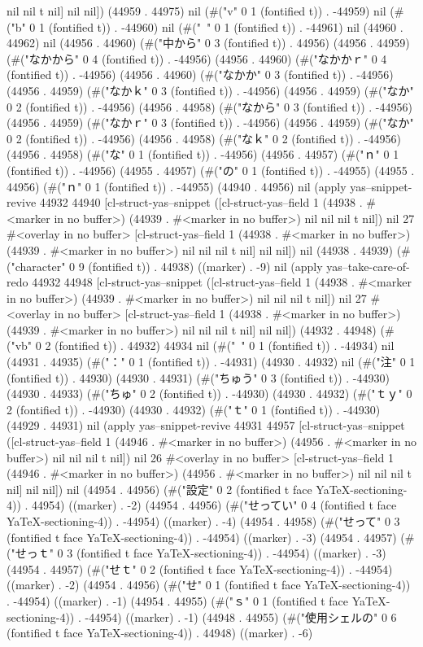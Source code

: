 nil nil t nil] nil nil]) (44959 . 44975) nil (#("v" 0 1 (fontified t)) . -44959) nil (#("b" 0 1 (fontified t)) . -44960) nil (#("~" 0 1 (fontified t)) . -44961) nil (44960 . 44962) nil (44956 . 44960) (#("中から" 0 3 (fontified t)) . 44956) (44956 . 44959) (#("なかから" 0 4 (fontified t)) . -44956) (44956 . 44960) (#("なかかｒ" 0 4 (fontified t)) . -44956) (44956 . 44960) (#("なかか" 0 3 (fontified t)) . -44956) (44956 . 44959) (#("なかｋ" 0 3 (fontified t)) . -44956) (44956 . 44959) (#("なか" 0 2 (fontified t)) . -44956) (44956 . 44958) (#("なから" 0 3 (fontified t)) . -44956) (44956 . 44959) (#("なかｒ" 0 3 (fontified t)) . -44956) (44956 . 44959) (#("なか" 0 2 (fontified t)) . -44956) (44956 . 44958) (#("なｋ" 0 2 (fontified t)) . -44956) (44956 . 44958) (#("な" 0 1 (fontified t)) . -44956) (44956 . 44957) (#("ｎ" 0 1 (fontified t)) . -44956) (44955 . 44957) (#("の" 0 1 (fontified t)) . -44955) (44955 . 44956) (#("ｎ" 0 1 (fontified t)) . -44955) (44940 . 44956) nil (apply yas--snippet-revive 44932 44940 [cl-struct-yas--snippet ([cl-struct-yas--field 1 (44938 . #<marker in no buffer>) (44939 . #<marker in no buffer>) nil nil nil t nil]) nil 27 #<overlay in no buffer> [cl-struct-yas--field 1 (44938 . #<marker in no buffer>) (44939 . #<marker in no buffer>) nil nil nil t nil] nil nil]) nil (44938 . 44939) (#("character" 0 9 (fontified t)) . 44938) ((marker) . -9) nil (apply yas--take-care-of-redo 44932 44948 [cl-struct-yas--snippet ([cl-struct-yas--field 1 (44938 . #<marker in no buffer>) (44939 . #<marker in no buffer>) nil nil nil t nil]) nil 27 #<overlay in no buffer> [cl-struct-yas--field 1 (44938 . #<marker in no buffer>) (44939 . #<marker in no buffer>) nil nil nil t nil] nil nil]) (44932 . 44948) (#("vb" 0 2 (fontified t)) . 44932) 44934 nil (#("~" 0 1 (fontified t)) . -44934) nil (44931 . 44935) (#("：" 0 1 (fontified t)) . -44931) (44930 . 44932) nil (#("注" 0 1 (fontified t)) . 44930) (44930 . 44931) (#("ちゅう" 0 3 (fontified t)) . -44930) (44930 . 44933) (#("ちゅ" 0 2 (fontified t)) . -44930) (44930 . 44932) (#("ｔｙ" 0 2 (fontified t)) . -44930) (44930 . 44932) (#("ｔ" 0 1 (fontified t)) . -44930) (44929 . 44931) nil (apply yas--snippet-revive 44931 44957 [cl-struct-yas--snippet ([cl-struct-yas--field 1 (44946 . #<marker in no buffer>) (44956 . #<marker in no buffer>) nil nil nil t nil]) nil 26 #<overlay in no buffer> [cl-struct-yas--field 1 (44946 . #<marker in no buffer>) (44956 . #<marker in no buffer>) nil nil nil t nil] nil nil]) nil (44954 . 44956) (#("設定" 0 2 (fontified t face YaTeX-sectioning-4)) . 44954) ((marker) . -2) (44954 . 44956) (#("せってい" 0 4 (fontified t face YaTeX-sectioning-4)) . -44954) ((marker) . -4) (44954 . 44958) (#("せって" 0 3 (fontified t face YaTeX-sectioning-4)) . -44954) ((marker) . -3) (44954 . 44957) (#("せっｔ" 0 3 (fontified t face YaTeX-sectioning-4)) . -44954) ((marker) . -3) (44954 . 44957) (#("せｔ" 0 2 (fontified t face YaTeX-sectioning-4)) . -44954) ((marker) . -2) (44954 . 44956) (#("せ" 0 1 (fontified t face YaTeX-sectioning-4)) . -44954) ((marker) . -1) (44954 . 44955) (#("ｓ" 0 1 (fontified t face YaTeX-sectioning-4)) . -44954) ((marker) . -1) (44948 . 44955) (#("使用シェルの" 0 6 (fontified t face YaTeX-sectioning-4)) . 44948) ((marker) . -6) 
